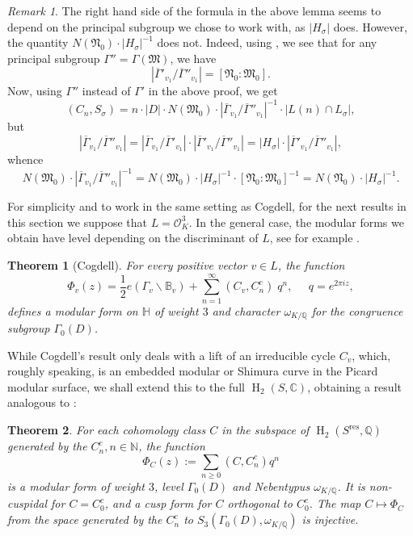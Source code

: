 \documentclass[12pt,a4paper,reqno]{amsart}
\theoremstyle{definition}
\numberwithin{definition}{subsection}
\theoremstyle{definition}
\numberwithin{Definition}{subsection}
\theoremstyle{remark}
\theoremstyle{remark}
\newtheorem{Remark}{Remark}
\numberwithin{Remark}{subsection}
\theoremstyle{remark}
\theoremstyle{plain}
\newtheorem{Theorem}{Theorem}
\numberwithin{Theorem}{subsection}
\theoremstyle{plain}
\theoremstyle{plain}
\theoremstyle{plain}
\theoremstyle{plain}
\theoremstyle{plain}
\theoremstyle{plain}
\theoremstyle{plain}
\newcommand*{\N}{\mathbb{N}}
\newcommand*{\Q}{\mathbb{Q}}
\newcommand*{\Cc}{\mathbb{C}}
\newcommand*{\Hh}{\mathbb{H}}
\DeclareMathOperator{\h}{H}
\begin{document}
\begin{Remark}
The right hand side of the formula in the above lemma seems to depend on the principal subgroup we chose to work with, as $|H_{\sigma}|$ does. However, the quantity $N(\mathfrak{N}_0)\cdot |H_{\sigma}|^{-1}$ does not. Indeed, using \cite[Lemma 2.3 ]{cogdell}, we see that for any principal subgroup $\Gamma''=\Gamma(\mathfrak{M})$, we have
\[
|\overline{\Gamma}'_{v_1}/\overline{\Gamma}''_{v_1}|=[\mathfrak{N}_0:\mathfrak{M}_0].
\]
Now, using $\Gamma''$ instead of $\Gamma'$ in the above proof, we get
\[
(C_n,S_\sigma)=n\cdot |D|\cdot N(\mathfrak{M}_0)\cdot |\overline{\Gamma}_{v_1}/\overline{\Gamma}''_{v_1}|^{-1}\cdot|L(n)\cap L_\sigma|,
\]
but 
\[
|\overline{\Gamma}_{v_1}/\overline{\Gamma}''_{v_1}|=|\overline{\Gamma}_{v_1}/\overline{\Gamma}'_{v_1}|\cdot|\overline{\Gamma}'_{v_1}/\overline{\Gamma}''_{v_1}|=|H_{\sigma}|\cdot|\overline{\Gamma}'_{v_1}/\overline{\Gamma}''_{v_1}|,
\]
whence
\[
N(\mathfrak{M}_0)\cdot |\overline{\Gamma}_{v_1}/\overline{\Gamma}''_{v_1}|^{-1}=N(\mathfrak{M}_0)\cdot |H_{\sigma}|^{-1}\cdot [\mathfrak{N}_0:\mathfrak{M}_0]^{-1}=N(\mathfrak{N}_0)\cdot |H_{\sigma}|^{-1}.
\]
\end{Remark}
For simplicity and to work in the same setting as Cogdell, for the next results in this section we suppose that $L=\mathcal{O}_K^3$. In the general case, the modular forms we obtain have level depending on the discriminant of $L$, see for example \cite[Theorem 6.4.1]{little}.
\begin{Theorem}[Cogdell]
For every positive vector $v\in L$, the function
\[
\Phi_v(z)=\frac{1}{2}e(\Gamma_v\backslash \mathbb{B}_v)+\sum_{n=1}^{\infty}(C_v, C_n^c)\;q^n,\;\;\;\;\; q=e^{2\pi iz},
\]
defines a modular form on $\Hh$ of weight $3$ and character $\omega_{K/\Q}$ for the congruence subgroup $\Gamma_0(D)$.
\end{Theorem}
While Cogdell's result only deals with a lift of an irreducible cycle $C_v$, which, roughly speaking, is an embedded modular or Shimura curve in the Picard modular surface, we shall extend this to the full $\h_2(S, \Cc)$, obtaining a result analogous to \cite[Theorem 3.1]{hirzebruch}:
\begin{Theorem}
\label{main}
For each cohomology class $C$ in the subspace of $\h_2(S^{\text{res}},\Q)$ generated by the $C_n^c, n\in \N$, the function
\[
\Phi_C(z):=\sum_{n\geq 0}(C,C_n^c)q^n
\]
is a modular form of weight $3$, level $\Gamma_0(D)$ and Nebentypus $\omega_{K/\Q}$. It is non-cuspidal for $C=C_0^c$, and a cusp form for $C$ orthogonal to $C_0^c$. The map $C\mapsto \Phi_C$ from the space generated by the $C_n^c$ to $S_3(\Gamma_0(D),\omega_{K/\Q})$ is injective.
\end{Theorem}
\end{document}
